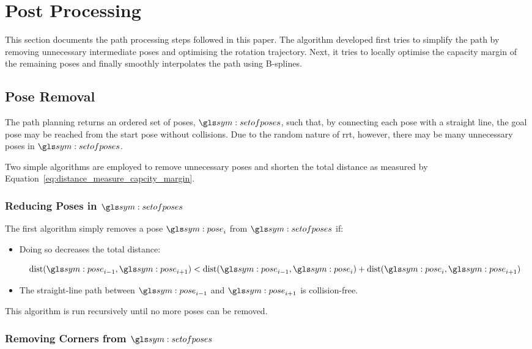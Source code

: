 \section{Post Processing}

	This section documents the path processing steps followed in this paper. The
	algorithm developed first tries to simplify the path by removing unnecessary
	intermediate poses and optimising the rotation trajectory. Next, it tries to
	locally optimise the capacity margin of the remaining poses and finally
	smoothly interpolates the path using B-splines.

	\subsection{Pose Removal}

		The path planning returns an ordered set of poses, $\setofposes$, such
		that, by connecting each pose with a straight line, the goal pose may be
		reached from the start pose without collisions. Due to the random nature
		of \gls{rrt}, however, there may be many unnecessary poses in
		$\setofposes$.

		Two simple algorithms are employed to remove unnecessary poses and
		shorten the total distance as measured by
		Equation~\ref{eq:distance_measure_capcity_margin}.

		\subsubsection{Reducing Poses in $\setofposes$}

			The first algorithm simply removes a pose $\pose_i$ from
			$\setofposes$ if:

			\begin{itemize}

				\item

					Doing so decreases the total distance:

					\begin{equation}
						\dist(\pose_{i - 1}, \pose_{i + 1}) <
							\dist(\pose_{i - 1}, \pose_i)
							+ \dist(\pose_i, \pose_{i + 1})
					\end{equation}

				\item

					The straight-line path between $\pose_{i - 1}$ and $\pose_{i
					+ 1}$ is collision-free.

			\end{itemize}

			This algorithm is run recursively until no more poses can be
			removed.

		\subsubsection{Removing Corners from $\setofposes$}

